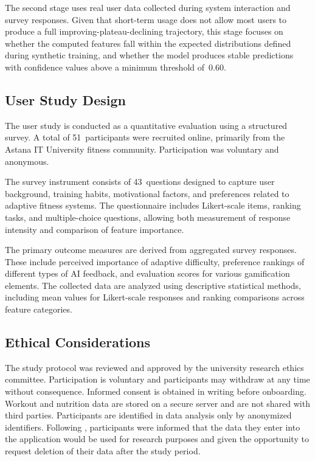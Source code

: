 \documentclass[12pt, a4paper]{report}
\begin{document}
The second stage uses real user data collected during system interaction and survey responses. Given that short-term usage does not allow most users to produce a full improving-plateau-declining trajectory, this stage focuses on whether the computed features fall within the expected distributions defined during synthetic training, and whether the model produces stable predictions with confidence values above a minimum threshold of~0.60.

\subsection{User Study Design}

The user study is conducted as a quantitative evaluation using a structured survey. A total of 51~participants were recruited online, primarily from the Astana IT University fitness community. Participation was voluntary and anonymous.

The survey instrument consists of 43~questions designed to capture user background, training habits, motivational factors, and preferences related to adaptive fitness systems. The questionnaire includes Likert-scale items, ranking tasks, and multiple-choice questions, allowing both measurement of response intensity and comparison of feature importance.

The primary outcome measures are derived from aggregated survey responses. These include perceived importance of adaptive difficulty, preference rankings of different types of AI feedback, and evaluation scores for various gamification elements. The collected data are analyzed using descriptive statistical methods, including mean values for Likert-scale responses and ranking comparisons across feature categories.

\subsection{Ethical Considerations}

The study protocol was reviewed and approved by the university research ethics committee. Participation is voluntary and participants may withdraw at any time without consequence. Informed consent is obtained in writing before onboarding. Workout and nutrition data are stored on a secure server and are not shared with third parties. Participants are identified in data analysis only by anonymized identifiers. Following \citet{buchanan2009}, participants were informed that the data they enter into the application would be used for research purposes and given the opportunity to request deletion of their data after the study period.
\end{document}
